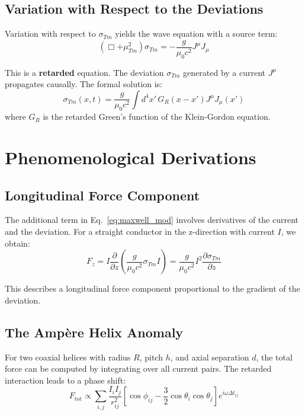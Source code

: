 	\subsection{Variation with Respect to the Deviations}
	Variation with respect to $\sigma_{Tm}$ yields the wave equation with a source term:
	\begin{equation}
		(\Box + \mu_{Tm}^2) \sigma_{Tm} = -\frac{g}{\mu_0 c^2} J^\mu J_\mu \label{eq:sigma_eq}
	\end{equation}
	
	This is a \textbf{retarded} equation. The deviation $\sigma_{Tm}$ generated by a current $J^\mu$ propagates causally. The formal solution is:
	\begin{equation}
		\sigma_{Tm}(x,t) = \frac{g}{\mu_0 c^2} \int d^4x' \, G_R(x-x') J^\mu J_\mu(x') \label{eq:sigma_solution}
	\end{equation}
	where $G_R$ is the retarded Green’s function of the Klein-Gordon equation.
	
	\section{Phenomenological Derivations}
	\subsection{Longitudinal Force Component}
	The additional term in Eq.~\ref{eq:maxwell_mod} involves derivatives of the current and the deviation. For a straight conductor in the z-direction with current $I$, we obtain:
	\begin{equation}
		F_z = I \frac{\partial}{\partial z} \left( \frac{g}{\mu_0 c^2} \sigma_{Tm} I \right) = \frac{g}{\mu_0 c^2} I^2 \frac{\partial \sigma_{Tm}}{\partial z} \label{eq:long_force}
	\end{equation}
	
	This describes a longitudinal force component proportional to the gradient of the deviation.
	
	\subsection{The Ampère Helix Anomaly}
	For two coaxial helices with radius $R$, pitch $h$, and axial separation $d$, the total force can be computed by integrating over all current pairs. The retarded interaction leads to a phase shift:
	\begin{equation}
		F_{\text{tot}} \propto \sum_{i,j} \frac{I_i I_j}{r_{ij}^2} \left[ \cos\phi_{ij} - \frac{3}{2} \cos\theta_i \cos\theta_j \right] e^{i\omega \Delta t_{ij}} \label{eq:helix_force}
	\end{equation}
	
